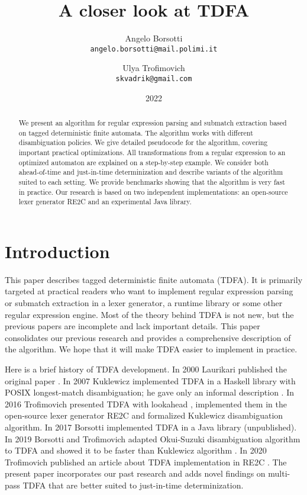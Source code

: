\documentclass[]{article}
\begin{document}
\title{A closer look at TDFA}
\author{
    Angelo Borsotti \\
    \texttt{\small{angelo.borsotti@mail.polimi.it}}
\and
    Ulya Trofimovich \\
    \texttt{\small{skvadrik@gmail.com}}
}
\date{2022}

\maketitle

\begin{abstract}
We present an algorithm for regular expression parsing and submatch extraction
based on tagged deterministic finite automata.
The algorithm works with different disambiguation policies.
We give detailed pseudocode for the algorithm, covering important practical optimizations.
All transformations from a regular expression to an optimized automaton are explained on a step-by-step example.
We consider both ahead-of-time and just-in-time determinization
and describe variants of the algorithm suited to each setting.
We provide benchmarks showing that the algorithm is very fast in practice.
Our research is based on two independent implementations:
an open-source lexer generator RE2C
and an experimental Java library.
\end{abstract}

\section*{Introduction}
This paper describes tagged deterministic finite automata (TDFA).
It is primarily targeted at practical readers who want to implement regular expression parsing or submatch extraction
in a lexer generator, a runtime library or some other regular expression engine.
Most of the theory behind TDFA is not new, but the previous papers are incomplete and lack important details.
This paper consolidates our previous research
and provides a comprehensive description of the algorithm.
We hope that it will make TDFA easier to implement in practice.
\medskip

%
Here is a brief history of TDFA development.
In 2000 Laurikari published the original paper \cite{Lau00}.
In 2007 Kuklewicz implemented TDFA in a Haskell library with POSIX longest-match disambiguation;
he gave only an informal description \cite{Kuk07}.
In 2016 Trofimovich presented TDFA with lookahead \cite{Tro17},
implemented them in the open-source lexer generator RE2C \cite{RE2C}
and formalized Kuklewicz disambiguation algorithm.
In 2017 Borsotti implemented TDFA in a Java library (unpublished).
In 2019 Borsotti and Trofimovich adapted Okui-Suzuki disambiguation algorithm to TDFA
and showed it to be faster than Kuklewicz algorithm \cite{BorTro19}.
In 2020 Trofimovich published an article about TDFA implementation in RE2C \cite{Tro20}.
%
The present paper incorporates our past research
and adds novel findings on multi-pass TDFA that are better suited to just-in-time determinization.
\medskip
\end{document}
